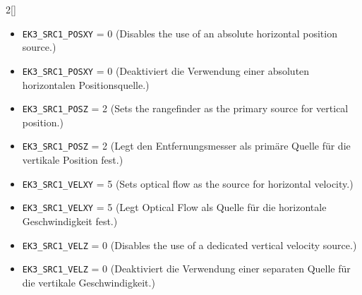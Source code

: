 \begin{paracol}{2}[]
\coleng

\begin{itemize}
\item \verb!EK3_SRC1_POSXY! = 0 \quad (Disables the use of an absolute horizontal position source.)
\end{itemize}
  
\colger

\begin{itemize}
\item \verb!EK3_SRC1_POSXY! = 0 \quad (Deaktiviert die Verwendung einer absoluten horizontalen Positionsquelle.)
\end{itemize}

\coleng

\begin{itemize}
\item \verb!EK3_SRC1_POSZ! = 2 \quad (Sets the rangefinder as the primary source for vertical position.)
\end{itemize}
  
\colger

\begin{itemize}
\item \verb!EK3_SRC1_POSZ! = 2 \quad (Legt den Entfernungsmesser als primäre Quelle für die vertikale Position fest.)
\end{itemize}

\coleng

\begin{itemize}
\item \verb!EK3_SRC1_VELXY! = 5 \quad (Sets optical flow as the source for horizontal velocity.)
\end{itemize}
  
\colger

\begin{itemize}
\item \verb!EK3_SRC1_VELXY! = 5 \quad (Legt Optical Flow als Quelle für die horizontale Geschwindigkeit fest.)
\end{itemize}

\coleng

\begin{itemize}
\item \verb!EK3_SRC1_VELZ! = 0 \quad (Disables the use of a dedicated vertical velocity source.)
\end{itemize}
  
\colger

\begin{itemize}
\item \verb!EK3_SRC1_VELZ! = 0 \quad (Deaktiviert die Verwendung einer separaten Quelle für die vertikale Geschwindigkeit.)
\end{itemize}


\end{paracol}
